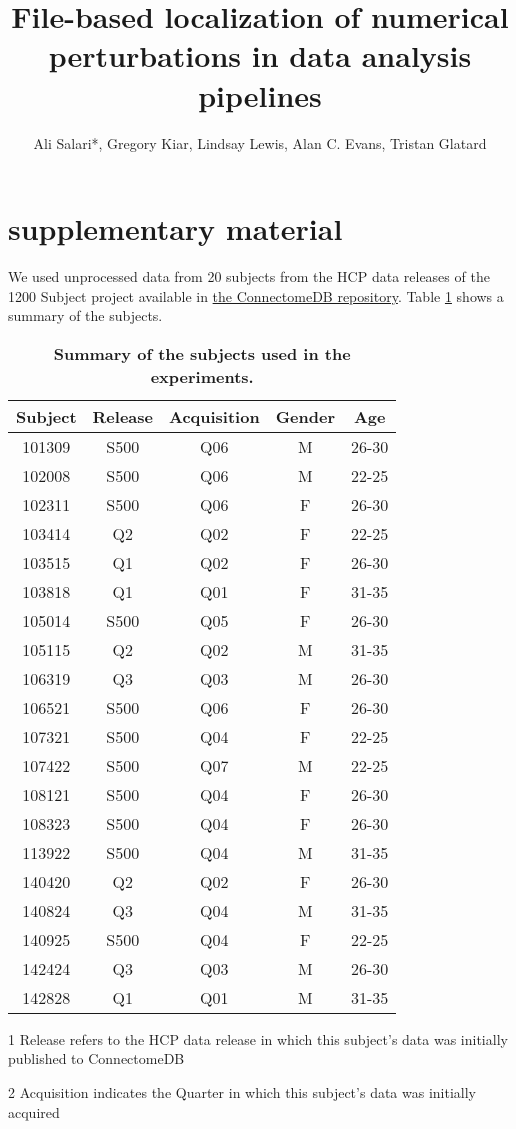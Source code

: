 \documentclass[11pt,a4paper]{osa-supplemental}
\title{File-based localization of numerical perturbations in data analysis pipelines}
\author{Ali Salari*, Gregory Kiar, Lindsay Lewis, Alan C. Evans, Tristan Glatard}
\begin{document}
\maketitle

\section{supplementary material}

We used unprocessed data from 20 subjects from the HCP data releases of the 1200 Subject project available in \href{https://db.humanconnectome.org}{the ConnectomeDB repository}.
Table \ref{tab:dataset} shows a summary of the subjects. 

\begin{table}[htbp]
\centering
\begin{threeparttable}
\caption{\bf Summary of the subjects used in the experiments.}
\begin{tabular}{ccccc}
\hline
Subject & Release\tnote{1} & Acquisition\tnote{2} & Gender & Age \\
\hline
101309 & S500 & Q06 & M & 26-30 \\
102008 & S500 & Q06 & M & 22-25 \\ 
102311 & S500 & Q06 & F & 26-30 \\
103414 & Q2 & Q02 & F & 22-25 \\
103515 & Q1 & Q02 & F & 26-30 \\
103818 & Q1 & Q01 & F & 31-35 \\
105014 & S500 & Q05 & F & 26-30 \\
105115 & Q2 & Q02 & M & 31-35 \\
106319 & Q3 & Q03 & M & 26-30 \\
106521 & S500 & Q06 & F & 26-30 \\
107321 & S500 & Q04 & F & 22-25 \\
107422 & S500 & Q07 & M & 22-25 \\
108121 & S500 & Q04 & F & 26-30 \\
108323 & S500 & Q04 & F & 26-30 \\
113922 & S500 & Q04 & M & 31-35 \\
140420 & Q2 & Q02 & F & 26-30 \\
140824 & Q3 & Q04 & M & 31-35 \\
140925 & S500 & Q04 & F & 22-25 \\
142424 & Q3 & Q03 & M & 26-30 \\
142828 & Q1 & Q01 & M & 31-35 \\
\hline
\end{tabular}
  \label{tab:dataset}
  \begin{tablenotes}
  \footnotesize
    \item[1] Release refers to the HCP data release in which this subject's data was initially published to ConnectomeDB
    \item[2] Acquisition indicates the Quarter in which this subject's data was initially acquired
  \end{tablenotes}
\end{threeparttable}
\end{table}

\end{document}
